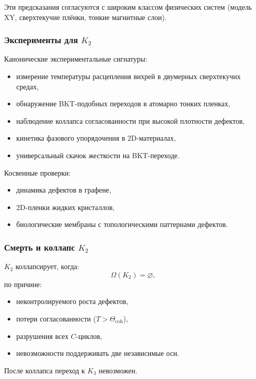 Эти предсказания согласуются с широким классом физических систем (модель XY,
сверхтекучие плёнки, тонкие магнитные слои).

\subsubsection{Эксперименты для \texorpdfstring{$K_2$}{K_2}}

Канонические экспериментальные сигнатуры:
\begin{itemize}
    \item измерение температуры расцепления вихрей в двумерных сверхтекучих средах,
    \item обнаружение BKT-подобных переходов в атомарно тонких пленках,
    \item наблюдение коллапса согласованности при высокой плотности дефектов,
    \item кинетика фазового упорядочения в 2D-материалах,
    \item универсальный скачок жесткости на BKT-переходе.
\end{itemize}

Косвенные проверки:
\begin{itemize}
    \item динамика дефектов в графене,
    \item 2D-пленки жидких кристаллов,
    \item биологические мембраны с топологическими паттернами дефектов.
\end{itemize}

\subsubsection{Смерть и коллапс \texorpdfstring{$K_2$}{K_2}}

$K_2$ коллапсирует, когда:
\[
\Omega(K_2) = \varnothing,
\]
по причине:
\begin{itemize}
    \item неконтролируемого роста дефектов,
    \item потери согласованности ($T > \Theta_{\mathrm{coh}}$),
    \item разрушения всех $C$-циклов,
    \item невозможности поддерживать две независимые оси.
\end{itemize}

После коллапса переход к $K_3$ невозможен.


